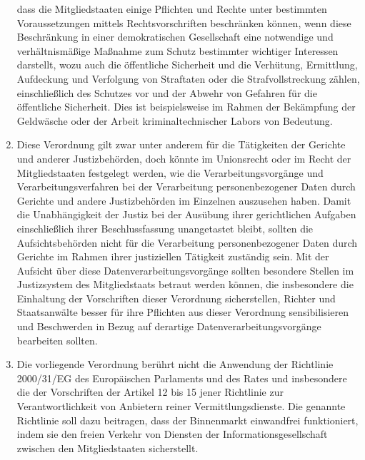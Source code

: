 \begin{enumerate}
     dass die Mitgliedstaaten einige Pflichten und Rechte unter bestimmten Voraussetzungen mittels Rechtsvorschriften
     beschränken können, wenn diese Beschränkung in einer demokratischen Gesellschaft eine notwendige und
     verhältnismäßige Maßnahme zum Schutz bestimmter wichtiger Interessen darstellt, wozu auch die öffentliche
     Sicherheit und die Verhütung, Ermittlung, Aufdeckung und Verfolgung von Straftaten oder die Strafvollstreckung
     zählen, einschließlich des Schutzes vor und der Abwehr von Gefahren für die öffentliche Sicherheit. Dies ist
     beispielsweise im Rahmen der Bekämpfung der Geldwäsche oder der Arbeit kriminaltechnischer Labors von Bedeutung.%
   \label{itm:eg-19}
   

   \item Diese Verordnung gilt zwar unter anderem für die Tätigkeiten der Gerichte und anderer Justizbehörden, doch
    könnte im Unionsrecht oder im Recht der Mitgliedstaaten festgelegt werden, wie die Verarbeitungsvorgänge und
    Verarbeitungsverfahren bei der Verarbeitung personenbezogener Daten durch Gerichte und andere Justizbehörden im
    Einzelnen auszusehen haben. Damit die Unabhängigkeit der Justiz bei der Ausübung ihrer gerichtlichen Aufgaben
    einschließlich ihrer Beschlussfassung unangetastet bleibt, sollten die Aufsichtsbehörden nicht für die Verarbeitung
    personenbezogener Daten durch Gerichte im Rahmen ihrer justiziellen Tätigkeit zuständig sein. Mit der Aufsicht über
    diese Datenverarbeitungsvorgänge sollten besondere Stellen im Justizsystem des Mitgliedstaats betraut werden
    können, die insbesondere die Einhaltung der Vorschriften dieser Verordnung sicherstellen, Richter und Staatsanwälte
    besser für ihre Pflichten aus dieser Verordnung sensibilisieren und Beschwerden in Bezug auf derartige
    Datenverarbeitungsvorgänge bearbeiten sollten.%
   \label{itm:eg-20}
   

   \item Die vorliegende Verordnung berührt nicht die Anwendung der Richtlinie 2000/31/EG des Europäischen Parlaments
    und des Rates und
    insbesondere die der Vorschriften der Artikel 12 bis 15 jener Richtlinie zur Verantwortlichkeit von Anbietern
    reiner Vermittlungsdienste. Die genannte Richtlinie soll dazu beitragen, dass der Binnenmarkt einwandfrei
    funktioniert, indem sie den freien Verkehr von Diensten der Informationsgesellschaft zwischen den Mitgliedstaaten
    sicherstellt.%
   \label{itm:eg-21}
   

\end{enumerate}
